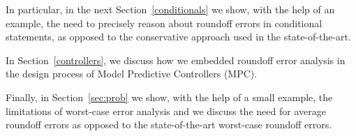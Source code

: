 In particular, in the next Section~\ref{conditionals} we show, with the help of an example, the need to precisely reason about roundoff errors in conditional statements, as opposed to the conservative approach used in the state-of-the-art.
%

In Section~\ref{controllers}, we discuss how we embedded roundoff error analysis in the design process of Model Predictive Controllers (MPC).
%

Finally, in Section~\ref{sec:prob} we show, with the help of a small example, the limitations of worst-case error analysis and we discuss the need for average roundoff errors as opposed to the state-of-the-art worst-case roundoff errors.
%
%

%
%
%
%
%

%
%
%

